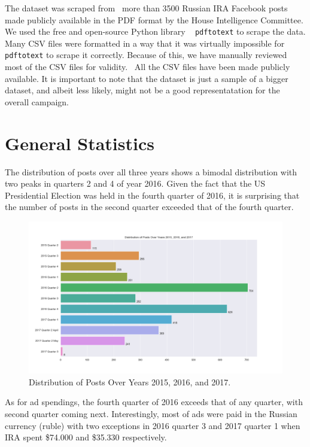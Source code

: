 \documentclass[12pt]{article}
\theoremstyle{definition}
\begin{document}
The dataset was scraped from~\cite{ira2016data} more than 3500 Russian IRA
Facebook posts made publicly available in the PDF format by the House
Intelligence Committee. We used the free and open-source Python library
~\cite{pdftotext} \texttt{pdftotext} to scrape the data. Many CSV files were
formatted in a way that it was virtually impossible for \texttt{pdftotext} to
scrape it correctly. Because of this, we have manually reviewed most of the
CSV files for validity.~\cite{ira2016csvdata} All the CSV files have been made
publicly available. It is important to note that the dataset is just a sample
of a bigger dataset, and albeit less likely, might not be a good representatation
for the overall campaign.


\section*{\centering General Statistics}
The distribution of posts over all three years shows a bimodal distribution
with two peaks in quarters 2 and 4 of year 2016. Given the fact that the US
Presidential Election was held in the fourth quarter of 2016, it is surprising
that the number of posts in the second quarter exceeded that of the fourth
quarter.

\begin{figure}[H]
\centering
\includegraphics[width=0.75\columnwidth]{./image/barchart-plots/barchart_distribution_of_posts.png}
\caption*{Distribution of Posts Over Years 2015, 2016, and 2017.}
\end{figure}

As for ad spendings, the fourth quarter of 2016 exceeds that of any quarter,
with second quarter coming next. Interestingly, most of ads were paid in the
Russian currency (ruble) with two exceptions in 2016 quarter 3 and 2017 quarter
1 when IRA spent \$74.000 and \$35.330 respectively.
\end{document}
